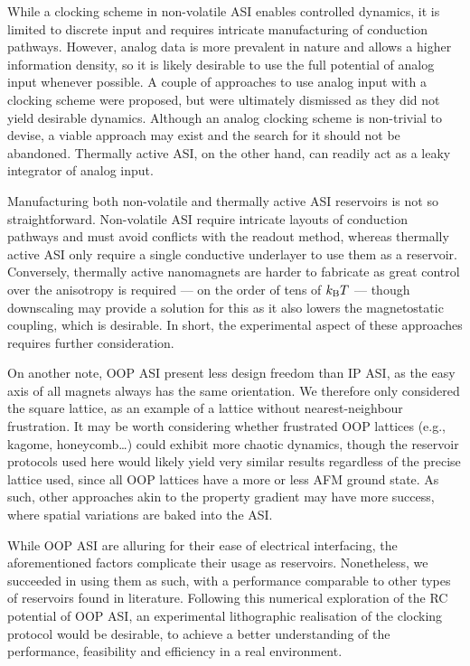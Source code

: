 While a clocking scheme in non-volatile ASI enables controlled dynamics, it is limited to discrete input and requires intricate manufacturing of conduction pathways.
However, analog data is more prevalent in nature and allows a higher information density, so it is likely desirable to use the full potential of analog input whenever possible.
A couple of approaches to use analog input with a clocking scheme were proposed, but were ultimately dismissed as they did not yield desirable dynamics.
Although an analog clocking scheme is non-trivial to devise, a viable approach may exist and the search for it should not be abandoned.
Thermally active ASI, on the other hand, can readily act as a leaky integrator of analog input. \par
Manufacturing both non-volatile and thermally active ASI reservoirs is not so straightforward.
Non-volatile ASI require intricate layouts of conduction pathways and must avoid conflicts with the readout method, whereas thermally active ASI only require a single conductive underlayer to use them as a reservoir.
Conversely, thermally active nanomagnets are harder to fabricate as great control over the anisotropy is required --- on the order of tens of $\kBT$ --- though downscaling may provide a solution for this as it also lowers the magnetostatic coupling, which is desirable.
In short, the experimental aspect of these approaches requires further consideration. \\\par

On another note, OOP ASI present less design freedom than IP ASI, as the easy axis of all magnets always has the same orientation.
We therefore only considered the square lattice, as an example of a lattice without nearest-neighbour frustration.
It may be worth considering whether frustrated OOP lattices (e.g., kagome, honeycomb\dots) could exhibit more chaotic dynamics, though the reservoir protocols used here would likely yield very similar results regardless of the precise lattice used, since all OOP lattices have a more or less AFM ground state.
As such, other approaches akin to the property gradient may have more success, where spatial variations are baked into the ASI. \\\par

While OOP ASI are alluring for their ease of electrical interfacing, the aforementioned factors complicate their usage as reservoirs.
Nonetheless, we succeeded in using them as such, with a performance comparable to other types of reservoirs found in literature.
Following this numerical exploration of the RC potential of OOP ASI, an experimental lithographic realisation of the clocking protocol would be desirable, to achieve a better understanding of the performance, feasibility and efficiency in a real environment.



